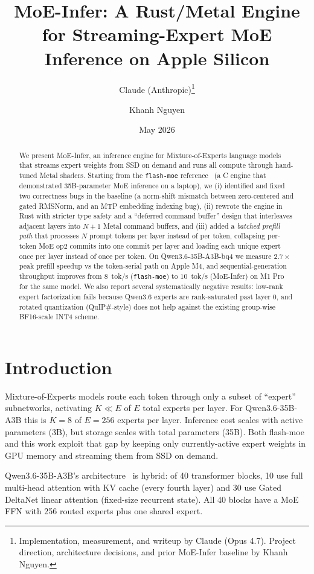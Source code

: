 \documentclass[11pt,a4paper]{article}
\title{MoE-Infer: A Rust/Metal Engine for Streaming-Expert MoE\\
Inference on Apple Silicon}
\author{Claude (Anthropic)\thanks{Implementation, measurement, and writeup
by Claude (Opus 4.7). Project direction, architecture decisions, and
prior MoE-Infer baseline by Khanh Nguyen.} \and Khanh Nguyen}
\date{May 2026}
\begin{document}
\maketitle

\begin{abstract}
We present MoE-Infer, an inference engine for Mixture-of-Experts language
models that streams expert weights from SSD on demand and runs all
compute through hand-tuned Metal shaders. Starting from the
\texttt{flash-moe} reference~\cite{flashmoe} (a C engine that demonstrated
35B-parameter MoE inference on a laptop), we (i) identified and fixed
two correctness bugs in the baseline (a norm-shift mismatch between
zero-centered and gated RMSNorm, and an MTP embedding indexing bug),
(ii) rewrote the engine in Rust with stricter type safety and a
``deferred command buffer'' design that interleaves adjacent layers into
$N{+}1$ Metal command buffers, and (iii) added a \emph{batched prefill
path} that processes $N$ prompt tokens per layer instead of per token,
collapsing per-token MoE op2 commits into one commit per layer and
loading each unique expert once per layer instead of once per token.
On Qwen3.6-35B-A3B-bq4 we measure $2.7\times$ peak prefill speedup vs
the token-serial path on Apple M4, and sequential-generation throughput
improves from $8$~tok/s (\texttt{flash-moe}) to $10$~tok/s (MoE-Infer)
on M1 Pro for the same model. We also report several systematically
negative results: low-rank expert factorization fails because Qwen3.6
experts are rank-saturated past layer 0, and rotated quantization
(QuIP\#-style) does not help against the existing group-wise BF16-scale
INT4 scheme.
\end{abstract}

\section{Introduction}

Mixture-of-Experts models route each token through only a subset of
``expert'' subnetworks, activating $K \ll E$ of $E$ total experts per
layer. For Qwen3.6-35B-A3B this is $K{=}8$ of $E{=}256$ experts per
layer. Inference cost scales with active parameters (3B), but storage
scales with total parameters (35B). Both flash-moe~\cite{flashmoe} and
this work exploit that gap by keeping only currently-active expert
weights in GPU memory and streaming them from SSD on demand.

Qwen3.6-35B-A3B's architecture~\cite{qwen3} is hybrid: of 40 transformer
blocks, 10 use full multi-head attention with KV cache (every fourth
layer) and 30 use Gated DeltaNet linear attention (fixed-size recurrent
state). All 40 blocks have a MoE FFN with 256 routed experts plus one
shared expert.
\end{document}
